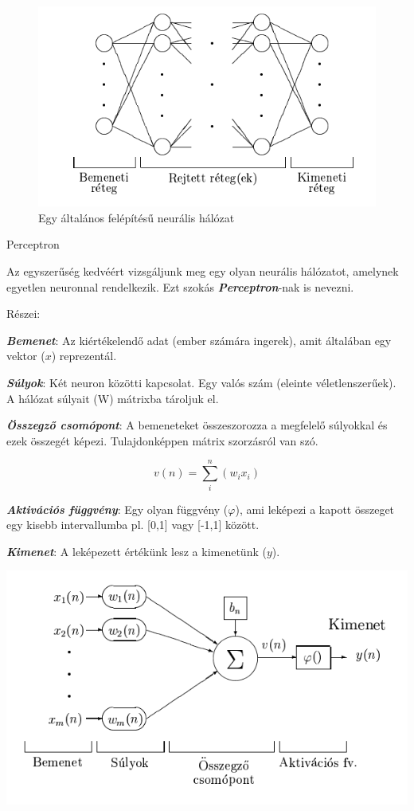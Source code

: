 \begin{figure}
	\centering
	\includegraphics[scale=0.75]{images/ANNLayers.png}
	\caption{Egy általános felépítésű neurális hálózat}
\end{figure}

\begin{Large}
Perceptron
\end{Large}

Az egyszerűség kedvéért vizsgáljunk meg egy olyan neurális hálózatot, amelynek egyetlen neuronnal rendelkezik. Ezt szokás \textbf{\textit{Perceptron}}-nak is nevezni. 

Részei: 

\textbf{\textit{Bemenet}}: Az kiértékelendő adat (ember számára ingerek), amit általában egy vektor (\(x\)) reprezentál. 

\textit{\textbf{Súlyok}}: Két neuron közötti kapcsolat. Egy valós szám (eleinte véletlenszerűek). A hálózat súlyait (W) mátrixba tároljuk el.  

\textbf{\textit{Összegző csomópont}}: A bemeneteket összeszorozza a megfelelő súlyokkal és ezek összegét képezi. Tulajdonképpen mátrix szorzásról van szó.  

\[v(n) = \sum_i^{n}(w_ix_i)\]

\textit{\textbf{Aktivációs függvény}}: Egy olyan függvény ($\varphi$), ami leképezi a kapott összeget egy kisebb intervallumba pl. [0,1] vagy [-1,1] között. 

\textbf{\textit{Kimenet}}: A leképezett értékünk lesz a kimenetünk (\(y\)). 

\begin{center}
	\includegraphics[scale=0.6]{images/ANNParts.png}
\end{center}

